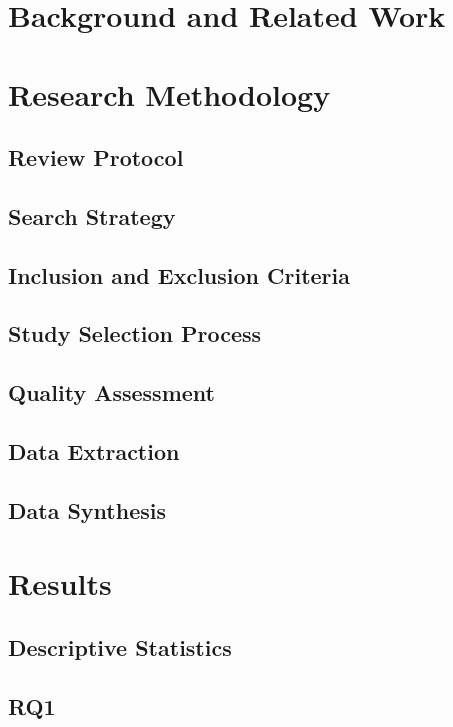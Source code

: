 \documentclass[smallextended]{svjour3}
\begin{document}
\section{Background and Related Work}

\section{Research Methodology}

\subsection{Review Protocol}

\subsection{Search Strategy}

\subsection{Inclusion and Exclusion Criteria}

\subsection{Study Selection Process}

\subsection{Quality Assessment}

\subsection{Data Extraction}

\subsection{Data Synthesis}

\section{Results}

\subsection{Descriptive Statistics}

\subsection{RQ1}
\end{document}
